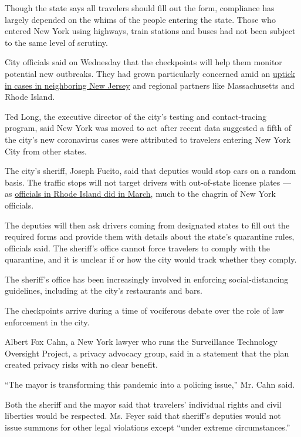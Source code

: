 Though the state says all travelers should fill out the form, compliance
has largely depended on the whims of the people entering the state.
Those who entered New York using highways, train stations and buses had
not been subject to the same level of scrutiny.

City officials said on Wednesday that the checkpoints will help them
monitor potential new outbreaks. They had grown particularly concerned
amid an
\href{https://www.nytimes3xbfgragh.onion/2020/07/30/nyregion/coronavirus-cases-nj.html?module=inline}{uptick
in cases in neighboring New Jersey} and regional partners like
Massachusetts and Rhode Island.

Ted Long, the executive director of the city's testing and
contact-tracing program, said New York was moved to act after recent
data suggested a fifth of the city's new coronavirus cases were
attributed to travelers entering New York City from other states.

The city's sheriff, Joseph Fucito, said that deputies would stop cars on
a random basis. The traffic stops will not target drivers with
out-of-state license plates --- as
\href{https://www.nytimes3xbfgragh.onion/2020/03/28/us/coronavirus-rhode-island-checkpoint.html?module=inline}{officials
in Rhode Island did in March}, much to the chagrin of New York
officials.

The deputies will then ask drivers coming from designated states to fill
out the required forms and provide them with details about the state's
quarantine rules, officials said. The sheriff's office cannot force
travelers to comply with the quarantine, and it is unclear if or how the
city would track whether they comply.

The sheriff's office has been increasingly involved in enforcing
social-distancing guidelines, including at the city's restaurants and
bars.

The checkpoints arrive during a time of vociferous debate over the role
of law enforcement in the city.

Albert Fox Cahn, a New York lawyer who runs the Surveillance Technology
Oversight Project, a privacy advocacy group, said in a statement that
the plan created privacy risks with no clear benefit.

``The mayor is transforming this pandemic into a policing issue,'' Mr.
Cahn said.

Both the sheriff and the mayor said that travelers' individual rights
and civil liberties would be respected. Ms. Feyer said that sheriff's
deputies would not issue summons for other legal violations except
``under extreme circumstances.''

